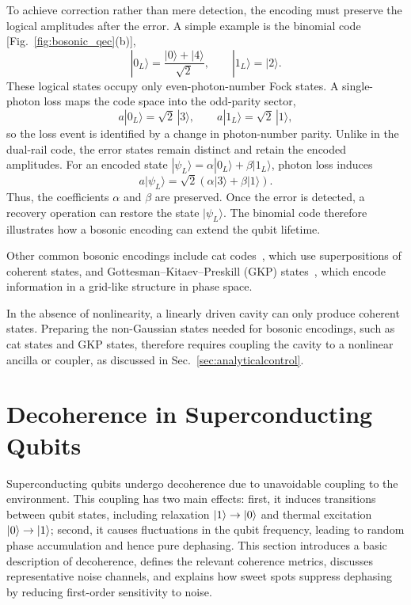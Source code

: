 To achieve correction rather than mere detection, the encoding must preserve the logical amplitudes after the error. A simple example is the binomial code [Fig.~\ref{fig:bosonic_qec}(b)],
\begin{equation}
    |0_L\rangle = \frac{|0\rangle + |4\rangle}{\sqrt{2}}, \qquad |1_L\rangle = |2\rangle.
\end{equation}
These logical states occupy only even-photon-number Fock states. A single-photon loss maps the code space into the odd-parity sector,
\begin{equation}
    a|0_L\rangle = \sqrt{2}\,|3\rangle, \qquad a|1_L\rangle = \sqrt{2}\,|1\rangle,
\end{equation}
so the loss event is identified by a change in photon-number parity. Unlike in the dual-rail code, the error states remain distinct and retain the encoded amplitudes. For an encoded state $|\psi_L\rangle = \alpha|0_L\rangle + \beta|1_L\rangle$, photon loss induces
\begin{equation}
    a|\psi_L\rangle = \sqrt{2}\left(\alpha|3\rangle + \beta|1\rangle\right).
\end{equation}
Thus, the coefficients $\alpha$ and $\beta$ are preserved. Once the error is detected, a recovery operation can restore the state $|\psi_L\rangle$. The binomial code therefore illustrates how a bosonic encoding can extend the qubit lifetime.

Other common bosonic encodings include cat codes~\cite{Mirrahimi2014,Grimm2020}, which use superpositions of coherent states, and Gottesman--Kitaev--Preskill (GKP) states~\cite{Gottesman2001,CampagneIbarcq2020}, which encode information in a grid-like structure in phase space. 

In the absence of nonlinearity, a linearly driven cavity can only produce coherent states. Preparing the non-Gaussian states needed for bosonic encodings, such as cat states and GKP states, therefore requires coupling the cavity to a nonlinear ancilla or coupler, as discussed in Sec.~\ref{sec:analyticalcontrol}.

\section{Decoherence in Superconducting Qubits}
\label{sec:decoherence}

Superconducting qubits undergo decoherence due to unavoidable coupling to the environment. This coupling has two main effects: first, it induces transitions between qubit states, including relaxation \(\ket{1}\rightarrow\ket{0}\) and thermal excitation \(\ket{0}\rightarrow\ket{1}\); second, it causes fluctuations in the qubit frequency, leading to random phase accumulation and hence pure dephasing. This section introduces a basic description of decoherence, defines the relevant coherence metrics, discusses representative noise channels, and explains how sweet spots suppress dephasing by reducing first-order sensitivity to noise.

